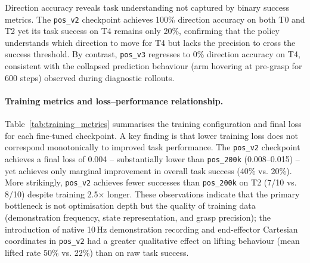\documentclass[12pt]{article}
\begin{document}
\begin{table}[H]
\centering
\caption{Direction accuracy (\% of trials with correct-direction block displacement).}
\label{tab:direction}
\end{table}

Direction accuracy reveals task understanding not captured by binary success metrics. The \texttt{pos\_v2} checkpoint achieves 100\% direction accuracy on both T0 and T2 yet its task success on T4 remains only 20\%, confirming that the policy understands which direction to move for T4 but lacks the precision to cross the success threshold. By contrast, \texttt{pos\_v3} regresses to 0\% direction accuracy on T4, consistent with the collapsed prediction behaviour (arm hovering at pre-grasp for 600 steps) observed during diagnostic rollouts.

\paragraph{Training metrics and loss--performance relationship.} Table~\ref{tab:training_metrics} summarises the training configuration and final loss for each fine-tuned checkpoint. A key finding is that lower training loss does not correspond monotonically to improved task performance. The \texttt{pos\_v2} checkpoint achieves a final loss of 0.004 -- substantially lower than \texttt{pos\_200k} (0.008--0.015) -- yet achieves only marginal improvement in overall task success (40\% vs. 20\%). More strikingly, \texttt{pos\_v2} achieves fewer successes than \texttt{pos\_200k} on T2 (7/10 vs. 8/10) despite training 2.5$\times$ longer. These observations indicate that the primary bottleneck is not optimisation depth but the quality of training data (demonstration frequency, state representation, and grasp precision); the introduction of native 10\,Hz demonstration recording and end-effector Cartesian coordinates in \texttt{pos\_v2} had a greater qualitative effect on lifting behaviour (mean lifted rate 50\% vs. 22\%) than on raw task success.
\end{document}
